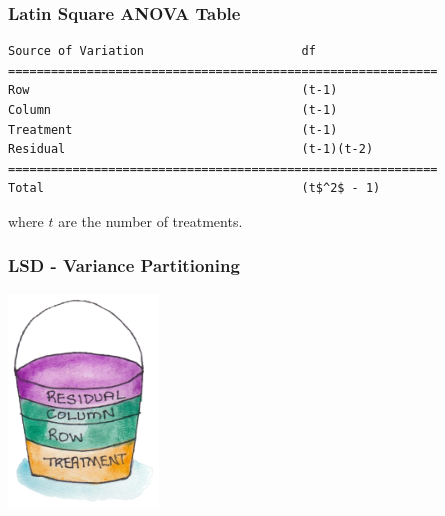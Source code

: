 \begin{frame}[fragile]\frametitle{Latin Square ANOVA Table}

\begin{lstlisting}[mathescape=true]
Source of Variation                      df
============================================================
Row                                      (t-1)
Column                                   (t-1)
Treatment                                (t-1)
Residual                                 (t-1)(t-2)
============================================================
Total                                    (t$^2$ - 1)
\end{lstlisting}

where $t$ are the number of treatments.

\end{frame}



\begin{frame}\frametitle{LSD - Variance Partitioning}
\centering
\includegraphics[width = 4cm]{lsbucket.png}

\end{frame}



